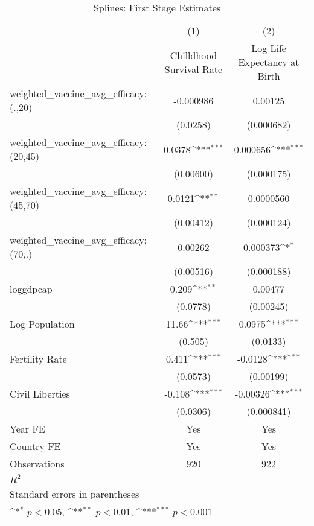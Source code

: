 \begin{table}[htbp]\centering
\def\sym#1{\ifmmode^{#1}\else\(^{#1}\)\fi}
\caption{Splines: First Stage Estimates}
\begin{tabular}{l*{2}{c}}
\toprule
                &\multicolumn{1}{c}{(1)}&\multicolumn{1}{c}{(2)}\\
                &\multicolumn{1}{c}{Chilldhood Survival Rate}&\multicolumn{1}{c}{Log Life Expectancy at Birth}\\
\midrule
weighted\_vaccine\_avg\_efficacy: (.,20)&-0.000986         &  0.00125         \\
                & (0.0258)         &(0.000682)         \\
\addlinespace
weighted\_vaccine\_avg\_efficacy: (20,45)&   0.0378\sym{***}& 0.000656\sym{***}\\
                &(0.00600)         &(0.000175)         \\
\addlinespace
weighted\_vaccine\_avg\_efficacy: (45,70)&   0.0121\sym{**} &0.0000560         \\
                &(0.00412)         &(0.000124)         \\
\addlinespace
weighted\_vaccine\_avg\_efficacy: (70,.)&  0.00262         & 0.000373\sym{*}  \\
                &(0.00516)         &(0.000188)         \\
\addlinespace
loggdpcap       &    0.209\sym{**} &  0.00477         \\
                & (0.0778)         &(0.00245)         \\
\addlinespace
Log Population  &    11.66\sym{***}&   0.0975\sym{***}\\
                &  (0.505)         & (0.0133)         \\
\addlinespace
Fertility Rate  &    0.411\sym{***}&  -0.0128\sym{***}\\
                & (0.0573)         &(0.00199)         \\
\addlinespace
Civil Liberties &   -0.108\sym{***}& -0.00326\sym{***}\\
                & (0.0306)         &(0.000841)         \\
\addlinespace
Year FE         &      Yes         &      Yes         \\
\addlinespace
Country FE      &      Yes         &      Yes         \\
\midrule
Observations    &      920         &      922         \\
\(R^{2}\)       &                  &                  \\
\bottomrule
\multicolumn{3}{l}{\footnotesize Standard errors in parentheses}\\
\multicolumn{3}{l}{\footnotesize \sym{*} \(p<0.05\), \sym{**} \(p<0.01\), \sym{***} \(p<0.001\)}\\
\end{tabular}
\end{table}
